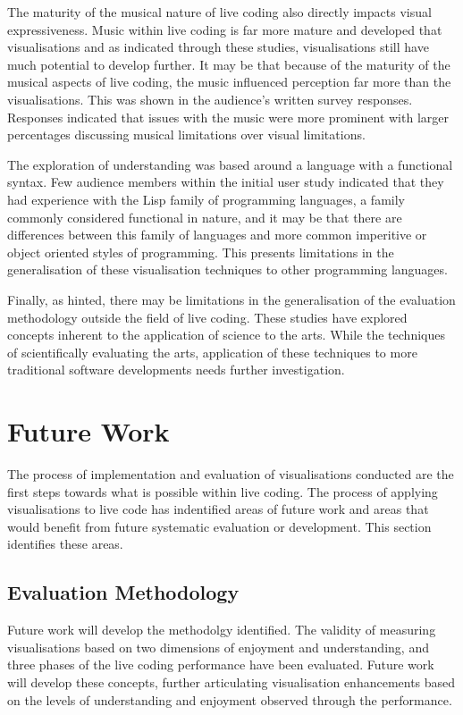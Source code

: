 The maturity of the musical nature of live coding also directly impacts visual expressiveness. Music within live coding is far more mature and developed that visualisations and as indicated through these studies, visualisations still have much potential to develop further. It may be that because of the maturity of the musical aspects of live coding, the music influenced perception far more than the visualisations. This was shown in the audience's written survey responses. Responses indicated that issues with the music were more prominent with larger percentages discussing musical limitations over visual limitations.

The exploration of understanding was based around a language with a functional syntax. Few audience members within the initial user study indicated that they had experience with the Lisp family of programming languages, a family commonly considered functional in nature, and it may be that there are differences between this family of languages and more common imperitive or object oriented styles of programming. This presents limitations in the generalisation of these visualisation techniques to other programming languages.

Finally, as hinted, there may be limitations in the generalisation of the evaluation methodology outside the field of live coding. These studies have explored concepts inherent to the application of science to the arts. While the techniques of scientifically evaluating the arts, application of these techniques to more traditional software developments needs further investigation.

\section{Future Work}

The process of implementation and evaluation of visualisations conducted are the first steps towards what is possible within live coding. The process of applying visualisations to live code has indentified areas of future work and areas that would benefit from future systematic evaluation or development. This section identifies these areas. 

\subsection{Evaluation Methodology}

Future work will develop the methodolgy identified. The validity of measuring visualisations based on two dimensions of enjoyment and understanding, and three phases of the live coding performance have been evaluated. Future work will develop these concepts, further articulating visualisation enhancements based on the levels of understanding and enjoyment observed through the performance. 

